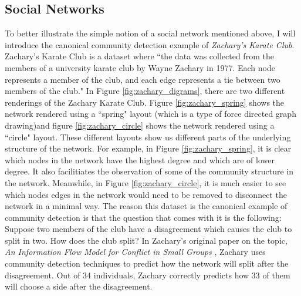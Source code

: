 \subsection{Social Networks}\label{sec:Social Networks}
To better illustrate the simple notion of a social network mentioned above, I will introduce the canonical community detection example of \emph{Zachary's Karate Club}. Zachary's Karate Club is a dataset where ``the data was collected from the members of a university karate club by Wayne Zachary in 1977.  Each node represents a member of the club, and each edge represents a tie between two members of the club." \cite[Metadata]{konect:2017:ucidata-zachary} In Figure \ref{fig:zachary_digrams}, there are two different renderings of the Zachary Karate Club. Figure \ref{fig:zachary_spring} shows the network rendered using a ``spring" layout (which is a type of force directed graph drawing\cite{kobourov12})and figure \ref{fig:zachary_circle} shows the network rendered using a ``circle" layout. These different layouts show us different parts of the underlying structure of the network. For example, in Figure \ref{fig:zachary_spring}, it is clear which nodes in the network have the highest degree and which are of lower degree. It also facilitiates the observation of some of the community structure in the network. Meanwhile, in Figure \ref{fig:zachary_circle}, it is much easier to see which nodes edges in the network would need to be removed to disconnect the network in a minimal way. The reason this dataset is the canonical example of community detection is that the question that comes with it is the following: Suppose two members of the club have a disagreement which causes the club to split in two. How does the club split? In Zachary's original paper on the topic, \emph{An Information Flow Model for Conflict in Small Groups} \cite{konect:ucidata-zachary}, Zachary uses community detection techniques to predict how the network will split after the disagreement. Out of 34 individuals, Zachary correctly predicts how 33 of them will choose a side after the disagreement.

